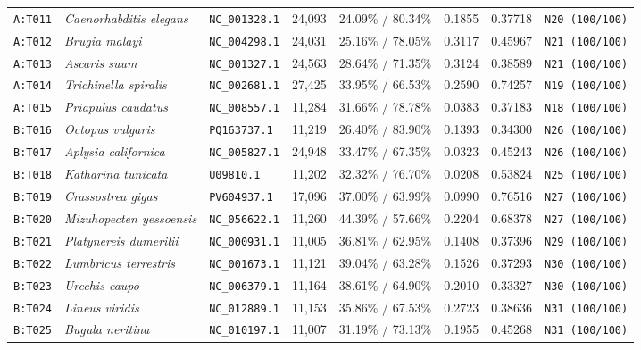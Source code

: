 \documentclass[10pt,letterpaper]{article}
\begin{document}
\begin{longtable}{llllllll}
\texttt{A:T011} & \textit{Caenorhabditis elegans} & \texttt{NC\_001328.1} & 24,093 & 24.09\% / 80.34\% & 0.1855 & 0.37718 & \texttt{N20 (100/100)} \\
\texttt{A:T012} & \textit{Brugia malayi} & \texttt{NC\_004298.1} & 24,031 & 25.16\% / 78.05\% & 0.3117 & 0.45967 & \texttt{N21 (100/100)} \\
\texttt{A:T013} & \textit{Ascaris suum} & \texttt{NC\_001327.1} & 24,563 & 28.64\% / 71.35\% & 0.3124 & 0.38589 & \texttt{N21 (100/100)} \\
\texttt{A:T014} & \textit{Trichinella spiralis} & \texttt{NC\_002681.1} & 27,425 & 33.95\% / 66.53\% & 0.2590 & 0.74257 & \texttt{N19 (100/100)} \\
\texttt{A:T015} & \textit{Priapulus caudatus} & \texttt{NC\_008557.1} & 11,284 & 31.66\% / 78.78\% & 0.0383 & 0.37183 & \texttt{N18 (100/100)} \\
\texttt{B:T016} & \textit{Octopus vulgaris} & \texttt{PQ163737.1} & 11,219 & 26.40\% / 83.90\% & 0.1393 & 0.34300 & \texttt{N26 (100/100)} \\
\texttt{B:T017} & \textit{Aplysia californica} & \texttt{NC\_005827.1} & 24,948 & 33.47\% / 67.35\% & 0.0323 & 0.45243 & \texttt{N26 (100/100)} \\
\texttt{B:T018} & \textit{Katharina tunicata} & \texttt{U09810.1} & 11,202 & 32.32\% / 76.70\% & 0.0208 & 0.53824 & \texttt{N25 (100/100)} \\
\texttt{B:T019} & \textit{Crassostrea gigas} & \texttt{PV604937.1} & 17,096 & 37.00\% / 63.99\% & 0.0990 & 0.76516 & \texttt{N27 (100/100)} \\
\texttt{B:T020} & \textit{Mizuhopecten yessoensis} & \texttt{NC\_056622.1} & 11,260 & 44.39\% / 57.66\% & 0.2204 & 0.68378 & \texttt{N27 (100/100)} \\
\texttt{B:T021} & \textit{Platynereis dumerilii} & \texttt{NC\_000931.1} & 11,005 & 36.81\% / 62.95\% & 0.1408 & 0.37396 & \texttt{N29 (100/100)} \\
\texttt{B:T022} & \textit{Lumbricus terrestris} & \texttt{NC\_001673.1} & 11,121 & 39.04\% / 63.28\% & 0.1526 & 0.37293 & \texttt{N30 (100/100)} \\
\texttt{B:T023} & \textit{Urechis caupo} & \texttt{NC\_006379.1} & 11,164 & 38.61\% / 64.90\% & 0.2010 & 0.33327 & \texttt{N30 (100/100)} \\
\texttt{B:T024} & \textit{Lineus viridis} & \texttt{NC\_012889.1} & 11,153 & 35.86\% / 67.53\% & 0.2723 & 0.38636 & \texttt{N31 (100/100)} \\
\texttt{B:T025} & \textit{Bugula neritina} & \texttt{NC\_010197.1} & 11,007 & 31.19\% / 73.13\% & 0.1955 & 0.45268 & \texttt{N31 (100/100)} \\

\end{longtable}
\end{document}
